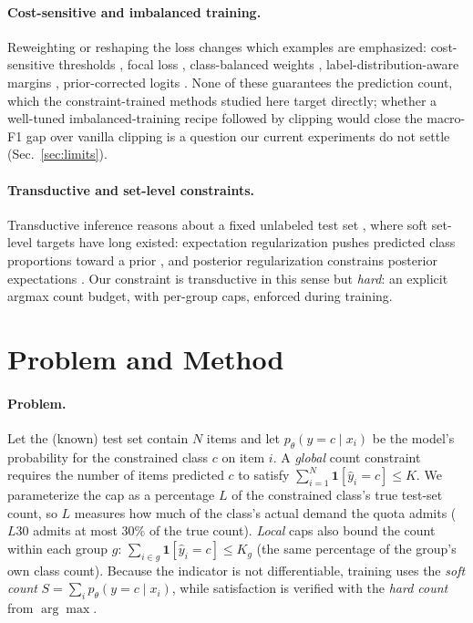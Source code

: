 \documentclass[10pt]{article}
\begin{document}
\paragraph{Cost-sensitive and imbalanced training.}
Reweighting or reshaping the loss changes which examples are emphasized:
cost-sensitive thresholds \citep{elkan2001foundations}, focal loss
\citep{lin2017focal}, class-balanced weights \citep{cui2019class},
label-distribution-aware margins \citep{cao2019learning}, prior-corrected
logits \citep{menon2020long}. None of these guarantees the prediction count,
which the constraint-trained methods studied here target directly; whether a
well-tuned imbalanced-training recipe followed by clipping would close the
macro-F1 gap over vanilla clipping is a question our current experiments do
not settle (Sec.~\ref{sec:limits}).

\paragraph{Transductive and set-level constraints.}
Transductive inference reasons about a fixed unlabeled test set
\citep{vapnik1998statistical,joachims1999transductive}, where soft set-level
targets have long existed: expectation regularization pushes predicted class
proportions toward a prior \citep{mann2007simple}, and posterior
regularization constrains posterior expectations \citep{ganchev2009posterior}.
Our constraint is transductive in this sense but \emph{hard}: an explicit
argmax count budget, with per-group caps, enforced during training.

\section{Problem and Method}
\label{sec:method}

\paragraph{Problem.}
Let the (known) test set contain $N$ items and let $p_\theta(y=c\mid x_i)$ be
the model's probability for the constrained class $c$ on item $i$. A
\emph{global} count constraint requires the number of items predicted $c$ to
satisfy $\sum_{i=1}^{N}\mathbf{1}[\hat y_i = c] \le K$. We parameterize the
cap as a percentage $L$ of the constrained class's true test-set count, so
$L$ measures how much of the class's actual demand the quota admits ($L30$
admits at most $30\%$ of the true count). \emph{Local} caps also bound the
count within each group $g$: $\sum_{i\in g}\mathbf{1}[\hat y_i=c]\le K_g$
(the same percentage of the group's own class count). Because the indicator
is not differentiable, training uses the \emph{soft count}
$S=\sum_i p_\theta(y=c\mid x_i)$, while satisfaction is verified with the
\emph{hard count} from $\arg\max$.
\end{document}
